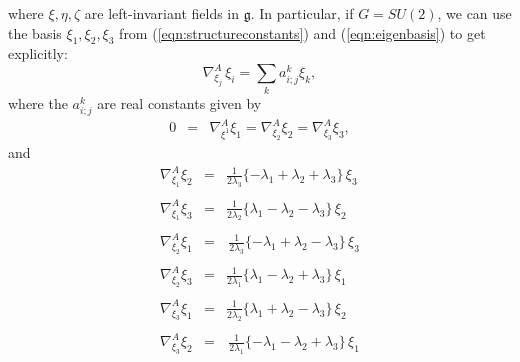 \documentclass[12pt,reqno]{amsart}\usepackage{amssymb,amsmath,amscd,epsfig,amsthm,enumerate,import,eufrak}
\theoremstyle{definition}
\theoremstyle{remark}
\numberwithin{equation}{section}
\theoremstyle{plain}
\theoremstyle{definition}
\def \mfg {\mathfrak{g}}
\def \naba {\nabla^A}
\theoremstyle{remark}
\numberwithin{theorem}{section}
\begin{document}
%
%
where $\xi, \eta, \zeta$ are left-invariant fields in $\mfg$. In particular, if $G = SU(2)$, we can use the basis $\xi_1, \xi_2, \xi_3$ from (\ref{eqn:structureconstants}) and (\ref{eqn:eigenbasis}) to get explicitly:
%
%
\begin{equation} \label{eqn:LCG1}
	\naba_{\xi_j}\, \xi_i = \sum_k a_{i; j}^k \xi_k,
\end{equation}
%
%
where the $a_{i; j}^k$ are real constants given by
%
\begin{equation} \label{eqn:1pggeod}
	\begin{array}{rcl}
		0 	& = & \naba_{\xi^1}\xi_1 = \naba_{\xi_2}\xi_2 = \naba_{\xi_3}\xi_3 , 
	\end{array}
\end{equation}
%
and		 
%
\begin{equation} \label{eqn:covder}
	\begin{array}{rcl}
		\naba_{\xi_1}\xi_2 & = & \frac1{2\lambda_3}\{-\lambda_1 + \lambda_2 + \lambda_3\} \, \xi_3 \\
			&	&	\\
		\naba_{\xi_1}\xi_3 & = & \frac1{2 \lambda_2} \{\lambda_1 - \lambda_2 - \lambda_3\}\, \xi_2 \\
			&	&	\\
		\naba_{\xi_2} \xi_1 & = & \, \frac1{2 \lambda_3} \{-\lambda_1 +\lambda_2 - \lambda_3\} \, \xi_3 \\
			&	&	\\
		\naba_{\xi_2} \xi_3 & = & \frac1{2 \lambda_1} \{\lambda_1 - \lambda_2 + \lambda_3\} \, \xi_1\\
			&	&	\\
		\naba_{\xi_3} \xi_1 & = & \frac1{2 \lambda_2}\{\lambda_1 + \lambda_2 - \lambda_3\} \, \xi_2 \\
			&	&	\\
		\naba_{\xi_3} \xi_2 & = & \, \frac1{2 \lambda_1} \{-\lambda_1 - \lambda_2 + \lambda_3\} \, \xi_1
	\end{array}
\end{equation} 
%
%
%
%
%
%
\end{document}
